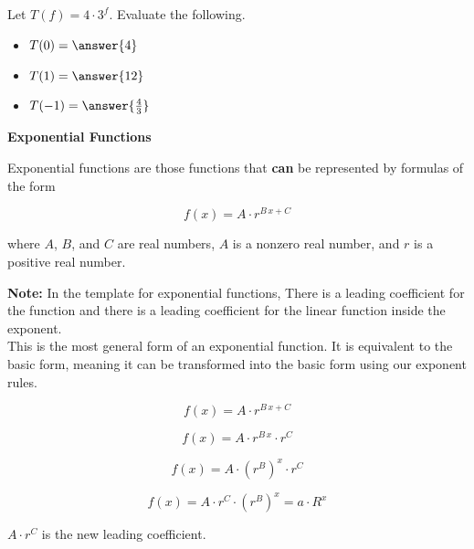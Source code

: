 \documentclass{ximera}
\begin{document}
\begin{example}

Let $T(f) = 4 \cdot 3^f$.  Evaluate the following.

\begin{itemize}
\item $T(0) = \answer{4}$ 
\item $T(1) = \answer{12}$
\item $T(-1) = \answer{\frac{4}{3}}$
\end{itemize}
\end{example}
















\begin{definition} \textbf{\textcolor{green!50!black}{Exponential Functions}}

Exponential functions are those functions that \textbf{\textcolor{purple!85!blue}{can}} be represented by formulas of the form


\[      f(x) = A \cdot r^{B \, x + C}   \]

where $A$, $B$, and $C$ are real numbers, $A$ is a nonzero real number, and $r$ is a positive real number.


\end{definition}

\textbf{Note:}  In the template for exponential functions, There is a leading coefficient for the function and there is a leading coefficient for the linear function inside the exponent. \\



This is the most general form of an exponential function.  It is equivalent to the basic form, meaning it can be transformed into the basic form using our exponent rules.




\[
f(x) = A \cdot r^{B \, x + C} 
\]

\[
f(x) = A \cdot r^{B \, x} \cdot  r^C 
\]

\[
f(x) = A \cdot (r^{B})^x \cdot  r^C 
\]


\[
f(x) = A \cdot r^C \cdot (r^{B})^x = a \cdot R^x
\]





$A \cdot r^C$ is the new leading coefficient. \\
\end{document}
